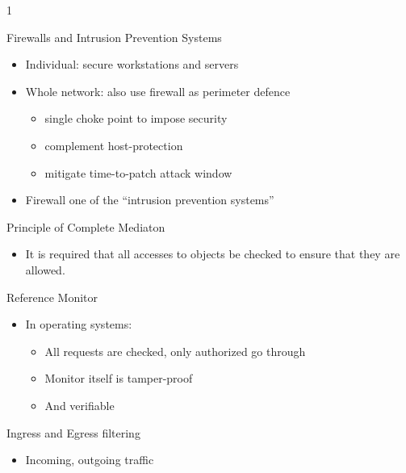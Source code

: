 1\documentclass{beamer}
\begin{document}
\begin{frame}{Firewalls and Intrusion Prevention Systems}
  \begin{itemize}
  \item Individual: secure workstations and servers 
  \item Whole network: also use firewall as perimeter 
    defence 
    \begin{itemize}
    \item single choke point to impose security
    \item complement host-protection
    \item mitigate time-to-patch attack window
    \end{itemize}
  \item Firewall one of the ``intrusion prevention systems''
  \end{itemize}
\end{frame}

\begin{frame}{Principle of Complete Mediaton}
  \begin{itemize}
    \item It is required that all accesses to objects be checked 
to ensure that they are allowed.
  \end{itemize}
\end{frame}

\begin{frame}{Reference Monitor}
  \begin{itemize}
  \item In operating systems: 
    \begin{itemize}
    \item All requests are checked, only authorized go 
      through 
    \item Monitor itself is tamper-proof 
    \item And verifiable 
    \end{itemize}
  \end{itemize}
\end{frame}

\begin{frame}{Ingress and Egress filtering}
  \begin{itemize}
    \item Incoming, outgoing traffic
  \end{itemize}
\end{frame}
\end{document}

